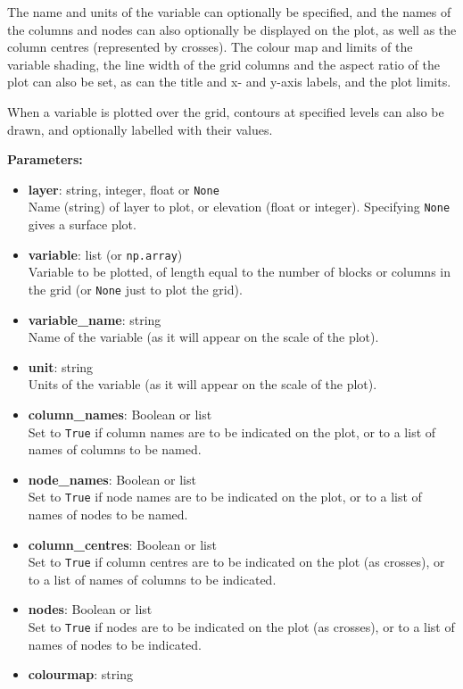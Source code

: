 The name and units of the variable can optionally be specified, and the names of the columns and nodes can also optionally be displayed on the plot, as well as the column centres (represented by crosses).  The colour map and limits of the variable shading, the line width of the grid columns and the aspect ratio of the plot can also be set, as can the title and x- and y-axis labels, and the plot limits.

When a variable is plotted over the grid, contours at specified levels can also be drawn, and optionally labelled with their values.

\textbf{Parameters:}
\begin{itemize}
\item \textbf{layer}: string, integer, float or \texttt{None}\\
  Name (string) of layer to plot, or elevation (float or integer).  Specifying \texttt{None} gives a surface plot.
\item \textbf{variable}: list (or \texttt{np.array})\\
  Variable to be plotted, of length equal to the number of blocks or columns in the grid (or \texttt{None} just to plot the grid).
\item \textbf{variable\_name}: string\\
  Name of the variable (as it will appear on the scale of the plot).
\item \textbf{unit}: string\\
  Units of the variable (as it will appear on the scale of the plot).
\item \textbf{column\_names}: Boolean or list\\
  Set to \texttt{True} if column names are to be indicated on the plot, or to a list of names of columns to be named.
\item \textbf{node\_names}: Boolean or list\\
  Set to \texttt{True} if node names are to be indicated on the plot, or to a list of names of nodes to be named.
\item \textbf{column\_centres}: Boolean or list\\
  Set to \texttt{True} if column centres are to be indicated on the plot (as crosses), or to a list of names of columns to be indicated.
\item \textbf{nodes}: Boolean or list\\
  Set to \texttt{True} if nodes are to be indicated on the plot (as crosses), or to a list of names of nodes to be indicated.
\item \textbf{colourmap}: string\\

\end{itemize}
